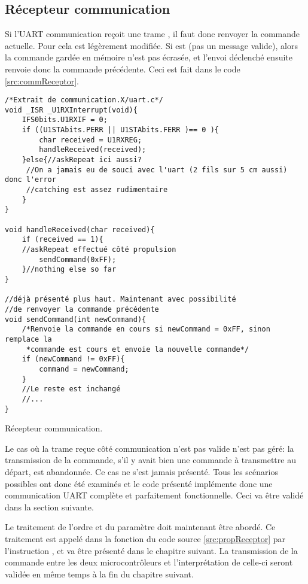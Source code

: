 \subsection{Récepteur communication}
Si l'UART communication reçoit une trame , il faut donc renvoyer la commande actuelle. Pour cela  est légèrement modifiée. Si  est  (pas un message valide), alors la commande gardée en mémoire n'est pas écrasée, et l'envoi déclenché ensuite renvoie donc la commande précédente. Ceci est fait dans le code \ref{src:commReceptor}.
\begin{listing}[htbp]
\begin{verbatim}
/*Extrait de communication.X/uart.c*/
void _ISR _U1RXInterrupt(void){
    IFS0bits.U1RXIF = 0;
    if ((U1STAbits.PERR || U1STAbits.FERR )== 0 ){
        char received = U1RXREG;
        handleReceived(received);
    }else{//askRepeat ici aussi?
     //On a jamais eu de souci avec l'uart (2 fils sur 5 cm aussi) donc l'error
     //catching est assez rudimentaire
    }
}

void handleReceived(char received){
    if (received == 1){
    //askRepeat effectué côté propulsion
        sendCommand(0xFF);
    }//nothing else so far
}

//déjà présenté plus haut. Maintenant avec possibilité
//de renvoyer la commande précédente
void sendCommand(int newCommand){
    /*Renvoie la commande en cours si newCommand = 0xFF, sinon remplace la
     *commande est cours et envoie la nouvelle commande*/
    if (newCommand != 0xFF){
        command = newCommand;
    }
    //Le reste est inchangé
    //...
}
\end{verbatim}
\caption{Récepteur communication.\label{src:commReceptor}}
\end{listing}
Le cas où la trame reçue côté communication n'est pas valide n'est pas géré: la transmission de la commande, s'il y avait bien une commande à transmettre au départ, est abandonnée. Ce cas ne s'est jamais présenté. Tous les scénarios possibles ont donc été examinés et le code présenté implémente donc une communication UART complète et parfaitement fonctionnelle. Ceci va être validé dans la section suivante.

Le traitement de l'ordre et du paramètre doit maintenant être abordé. Ce traitement est appelé dans la fonction  du code source \ref{src:propReceptor} par l'instruction , et va être présenté dans le chapitre suivant. La transmission de la commande entre les deux microcontrôleurs et l'interprétation de celle-ci seront validée en même temps à la fin du chapitre suivant.
